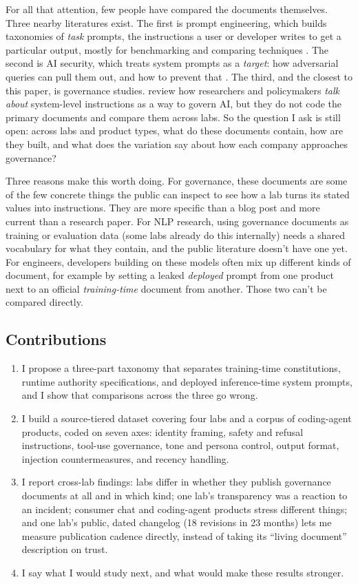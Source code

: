 \documentclass[11pt]{article}
\begin{document}
For all that attention, few people have compared the documents themselves.
Three nearby literatures exist. The first is prompt engineering, which builds
taxonomies of \emph{task} prompts, the instructions a user or developer writes
to get a particular output, mostly for benchmarking and comparing techniques
\citep{teler2023,liu2024survey}. The second is AI security, which treats
system prompts as a \emph{target}: how adversarial queries can pull them out,
and how to prevent that \citep{promptleak2026,proxyprompt2025}. The third, and
the closest to this paper, is governance studies.
\citet{neumann2026governance} review how researchers and policymakers
\emph{talk about} system-level instructions as a way to govern AI, but they do
not code the primary documents and compare them across labs. So the question
I ask is still open: across labs and product types, what do these documents
contain, how are they built, and what does the variation say about how each
company approaches governance?

Three reasons make this worth doing. For governance, these documents are some
of the few concrete things the public can inspect to see how a lab turns its
stated values into instructions. They are more specific than a blog post and
more current than a research paper. For NLP research, using governance
documents as training or evaluation data (some labs already do this
internally) needs a shared vocabulary for what they contain, and the public
literature doesn't have one yet. For engineers, developers building on these
models often mix up different kinds of document, for example by setting a
leaked \emph{deployed} prompt from one product next to an official
\emph{training-time} document from another. Those two can't be compared
directly.

\subsection*{Contributions}
\begin{enumerate}[leftmargin=*]
  \item I propose a three-part taxonomy that separates training-time
    constitutions, runtime authority specifications, and deployed
    inference-time system prompts, and I show that comparisons across the
    three go wrong.
  \item I build a source-tiered dataset covering four labs and a corpus of
    coding-agent products, coded on seven axes: identity framing,
    safety and refusal instructions, tool-use governance, tone and persona
    control, output format, injection countermeasures, and recency handling.
  \item I report cross-lab findings: labs differ in whether they publish
    governance documents at all and in which kind; one lab's transparency was
    a reaction to an incident; consumer chat and coding-agent products stress
    different things; and one lab's public, dated changelog (18 revisions in
    23 months) lets me measure publication cadence directly, instead of
    taking its ``living document'' description on trust.
  \item I say what I would study next, and what would make these results
    stronger.
\end{enumerate}
\end{document}
